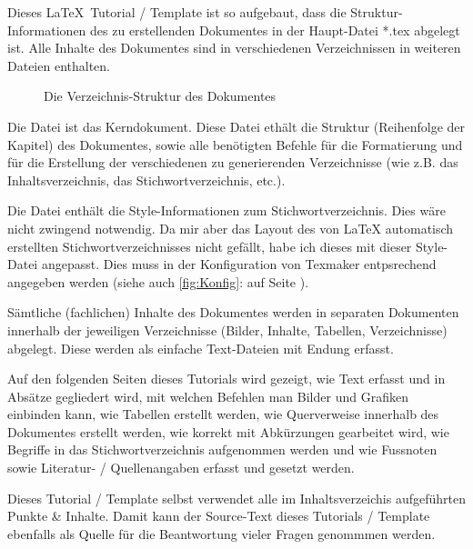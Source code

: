 Dieses \LaTeX\ Tutorial / Template ist so aufgebaut, dass die Struktur-Informationen des zu erstellenden Dokumentes in der Haupt-Datei *.tex abgelegt ist. Alle Inhalte des Dokumentes sind in verschiedenen Verzeichnissen in weiteren Dateien enthalten.

\begin{figure}[h!]
\centering
  \caption{Die Verzeichnis-Struktur des Dokumentes}
\end{figure}

Die Datei  ist das Kerndokument. Diese Datei ethält die Struktur (Reihenfolge der Kapitel) des Dokumentes, sowie alle benötigten Befehle für die Formatierung und für die Erstellung der verschiedenen zu generierenden Verzeichnisse (wie z.B. das Inhaltsverzeichnis, das Stichwortverzeichnis, etc.).  

Die Datei  enthält die Style-In\-for\-ma\-ti\-on\-en zum Stichwortverzeichnis. Dies wäre nicht zwingend notwendig. Da mir aber das Layout des von LaTeX automatisch erstellten Stichwortverzeichnisses nicht gefällt, habe ich dieses mit dieser Style-Datei angepasst. Dies muss in der Konfiguration von Texmaker entpsrechend angegeben werden (siehe auch \cref{fig:Konfig}:  auf Seite \pageref{fig:Konfig}).

Sämtliche (fachlichen) Inhalte des Dokumentes werden in separaten Dokumenten innerhalb der jeweiligen Verzeichnisse (Bilder, Inhalte, Tabellen, Verzeichnisse) abgelegt. Diese werden als einfache Text-Dateien mit Endung  erfasst. 

Auf den folgenden Seiten dieses Tutorials wird gezeigt, wie Text erfasst und in Absätze gegliedert wird, mit welchen Befehlen man Bilder und Grafiken einbinden kann, wie Tabellen erstellt werden, wie Querverweise innerhalb des Dokumentes erstellt werden, wie korrekt mit Abkürzungen gearbeitet wird, wie Begriffe in das Stichwortverzeichnis aufgenommen werden und wie Fussnoten sowie Literatur- / Quellenangaben erfasst  und gesetzt werden.

Dieses Tutorial / Template selbst verwendet alle im Inhaltsverzeichis aufgeführten Punkte \& Inhalte. Damit kann der Source-Text dieses Tutorials / Template  ebenfalls als Quelle für die Beantwortung vieler Fragen genommmen werden.
